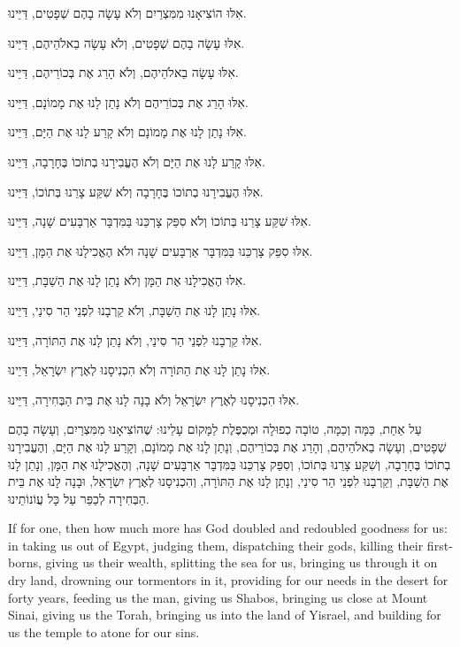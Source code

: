 \begin{center}

אִלּוּ הוֹצִיאָנוּ מִמִּצְרַיִם וְלֹא עָשָׂה בָהֶם שְׁפָטִים, דַּיֵּינוּ.

אִלּוּ עָשָׂה בָהֶם שְׁפָטִים, וְלֹא עָשָׂה בֵאלֹהֵיהֶם, דַּיֵּינוּ.

אִלּוּ עָשָׂה בֵאלֹהֵיהֶם, וְלֹא הָרַג אֶת בְּכוֹרֵיהֶם, דַּיֵּינוּ.

אִלּוּ הָרַג אֶת בְּכוֹרֵיהֶם וְלֹא נָתַן לָנוּ אֶת מָמוֹנָם, דַּיֵּינוּ.

אִלּוּ נָתַן לָנוּ אֶת מָמוֹנָם וְלֹא קָרַע לָנוּ אֶת הַיָּם, דַּיֵּינוּ.

אִלּוּ קָרַע לָנוּ אֶת הַיָּם וְלֹא הֶעֱבִירָנוּ בְתוֹכוֹ בֶּחָרָבָה, דַּיֵּינוּ.

אִלּוּ הֶעֱבִירָנוּ בְתוֹכוֹ בֶּחָרָבָה וְלֹא שִׁקַּע צָרֵנוּ בְּתוֹכוֹ, דַּיֵּינוּ.

אִלּוּ שִׁקַּע צָרֵנוּ בְּתוֹכוֹ וְלֹא סִפֵּק צָרְכֵּנוּ בַּמִּדְבָּר אַרְבָּעִים שָׁנָה, דַּיֵּינוּ.

אִלּוּ סִפֵּק צָרְכֵּנוּ בַּמִּדְבָּר אַרְבָּעִים שָׁנָה ולֹא הֶאֱכִילָנוּ אֶת הַמָּן, דַּיֵּינוּ.

אִלּוּ הֶאֱכִילָנוּ אֶת הַמָּן וְלֹא נָתַן לָנוּ אֶת הַשַׁבָּת, דַּיֵּינוּ.

אִלּוּ נָתַן לָנוּ אֶת הַשַׁבָּת, וְלֹא קֵרְבָנוּ לִפְנֵי הַר סִינַי, דַּיֵּינוּ.

אִלּוּ קֵרְבָנוּ לִפְנֵי הַר סִינַי, וְלֹא נָתַן לָנוּ אֶת הַתּוֹרָה, דַּיֵּינוּ.

אִלּוּ נָתַן לָנוּ אֶת הַתּוֹרָה וְלֹא הִכְנִיסָנוּ לְאֶרֶץ יִשְׂרָאֵל, דַּיֵינוּ.

אִלּוּ הִכְנִיסָנוּ לְאֶרֶץ יִשְׂרָאֵל וְלֹא בָנָה לָנוּ אֶת בֵּית הַבְּחִירָה, דַּיֵּינוּ.
 \end{center}
 
 
 עַל אַחַת, כַּמָּה וְכַמָּה, טוֹבָה כְפוּלָה וּמְכֻפֶּלֶת לַמָּקוֹם עָלֵינוּ: שֶׁהוֹצִיאָנוּ מִמִּצְרַיִם, וְעָשָׂה בָהֶם שְׁפָטִים, וְעָשָׂה בֵאלֹהֵיהֶם, וְהָרַג אֶת בְּכוֹרֵיהֶם, וְנָתַן לָנוּ אֶת מָמוֹנָם, וְקָרַע לָנוּ אֶת הַיָּם, וְהֶעֱבִירָנוּ בְתוֹכוֹ בֶּחָרָבָה, וְשִׁקַּע צָרֵנוּ בְּתוֹכוֹ, וְסִפֵּק צָרְכֵּנוּ בַּמִּדְבָּר אַרְבָּעִים שָׁנָה, וְהֶאֱכִילָנוּ אֶת הַמָּן, וְנָתַן לָנוּ אֶת הַשַׁבָּת, וְקֵרְבָנוּ לִפְנֵי הַר סִינַי, וְנָתַן לָנוּ אֶת הַתּוֹרָה, וְהִכְנִיסָנוּ לְאֶרֶץ יִשְׂרָאֵל, וּבָנָה לָנוּ אֶת בֵּית הַבְּחִירָה לְכַפֵּר עַל כָּל עֲוֹנוֹתֵינוּ.
 
 \begin{english}
If for one, then how much more has God doubled and redoubled goodness for us: in taking us out of Egypt, judging them, dispatching their gods, killing their firstborns, giving us their wealth, splitting the sea for us, bringing us through it on dry land, drowning our tormentors in it, providing for our needs in the desert for forty years, feeding us the man, giving us Shabos, bringing us close at Mount Sinai, giving us the Torah, bringing us into the land of Yisrael, and building for us the temple to atone for our sins.
\end{english}
 
